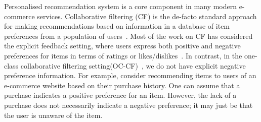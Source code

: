 Personalised recommendation system is a core component
in many modern e-commerce services. Collaborative
filtering (CF) is the de-facto standard approach for making recommendations
based on information in a database
of item preferences from a population of users~\citep{Goldberg:1992, Sarwar:2001}. Most of the work on CF has considered 
the explicit feedback
setting, where users express both positive and negative preferences
for items in terms of ratings or likes/dislikes~\citep{koren2009matrix}. In
contrast, in the one-class collaborative filtering setting(OC-CF)~\citep{Pan:2008}, we do not have
explicit negative preference information. For example, consider
recommending items to users of an e-commerce website
based on their purchase history. One can assume that a
purchase indicates a positive preference for an item. However,
the lack of a purchase does not necessarily indicate
a negative preference; it may just be that the user is unaware
of the item. 

